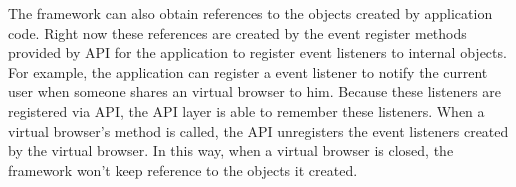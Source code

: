 \apireferencefig{}


The framework can also obtain references to the objects created by application
code.  Right now these references are created by the event register methods
provided by API for the application to register event listeners to internal
objects. For example, the application can register a event listener to notify
the current user when someone shares an virtual browser to him.  Because these
listeners are registered via API, the API layer is able to remember these
listeners. When a virtual browser's  method is called, the API
unregisters the event listeners created by the virtual browser. In this
way, when a virtual browser is closed, the framework won't keep reference to
the objects it created.
